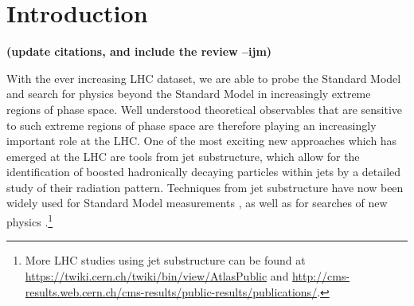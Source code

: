 \documentclass[11pt,letterpaper]{article}
\newcommand{\ijm}[1]{\textbf{\textcolor{llblue}{(#1 --ijm)}}}
\begin{document}
\maketitle

\section{Introduction}\label{sec:intro}

\ijm{update citations, and include the review}

With the ever increasing LHC dataset, we are able to probe the Standard Model and search for physics beyond the Standard Model in increasingly extreme regions of phase space. Well understood theoretical observables that are sensitive to such extreme regions of phase space are therefore playing an increasingly important role at the LHC. One of the most exciting new approaches which has emerged at the LHC are tools from jet substructure, which allow for the identification of boosted hadronically decaying particles within jets by a detailed study of their radiation pattern. Techniques from jet substructure have now been widely used for Standard Model measurements \cite{Chatrchyan:2012sn,CMS:2013cda,Aad:2015cua,Aad:2015lxa,ATLAS-CONF-2015-035,Aad:2015rpa,Aad:2015hna,ATLAS-CONF-2016-002,ATLAS-CONF-2016-039,ATLAS-CONF-2016-034,CMS-PAS-TOP-16-013,CMS-PAS-HIG-16-004}, as well as for searches of new physics  \cite{CMS:2011bqa,Fleischmann:2013woa,Pilot:2013bla,TheATLAScollaboration:2013qia,Chatrchyan:2012ku,CMS-PAS-B2G-14-001,CMS-PAS-B2G-14-002,Khachatryan:2015axa,Khachatryan:2015bma,Aad:2015owa,Aaboud:2016okv,Aaboud:2016trl,Aaboud:2016qgg,ATLAS-CONF-2016-055,ATLAS-CONF-2015-071,ATLAS-CONF-2015-068,CMS-PAS-EXO-16-037,CMS-PAS-EXO-16-040,Khachatryan:2016mdm,CMS-PAS-HIG-16-016,CMS-PAS-B2G-15-003,CMS-PAS-EXO-16-017}.\footnote{More LHC studies using jet substructure can be found at \url{https://twiki.cern.ch/twiki/bin/view/AtlasPublic} and \url{http://cms-results.web.cern.ch/cms-results/public-results/publications/}.} 
\end{document}
